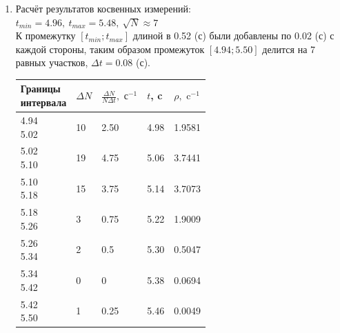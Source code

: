 \documentclass[12pt]{article}
\begin{document}
\begin{enumerate}
    \item Расчёт результатов косвенных измерений: \\
    $t_{min} = 4.96, \ t_{max} = 5.48, \ \sqrt{N} \approx 7$ \\
    К промежутку $[t_{min}; t_{max}]$ длиной в 0.52 (с) были добавлены по 0.02 (с) с каждой стороны, таким образом промежуток $[4.94; 5.50]$ делится на 7 равных участков, $\Delta t = 0.08$ (с). \\
    \begin{tabular}[1]{|m{}|m{}|m{}|m{}|m{}|}
    \hline
    \makecell{Границы \\интервала} & $\Delta N$ & $\frac{\Delta N}{N\Delta t}, \text{ с}^{-1}$ & $t$, c & $\rho, \text{ c}^{-1}$ \\
    \hline
    \makecell{4.94 \\5.02} & 10 & 2.50 & 4.98 & 1.9581 \\
    \hline
    \makecell{5.02 \\5.10} & 19 & 4.75 & 5.06 & 3.7441 \\
    \hline
    \makecell{5.10 \\5.18} & 15 & 3.75 & 5.14 & 3.7073 \\
    \hline
    \makecell{5.18 \\5.26} & 3 & 0.75 & 5.22 & 1.9009 \\
    \hline
    \makecell{5.26 \\5.34} & 2 & 0.5 & 5.30 & 0.5047 \\
    \hline
    \makecell{5.34 \\5.42} & 0 & 0 & 5.38 & 0.0694 \\
    \hline
    \makecell{5.42 \\5.50} & 1 & 0.25 & 5.46 & 0.0049 \\
    \hline
    \end{tabular}


\end{enumerate}
\end{document}
